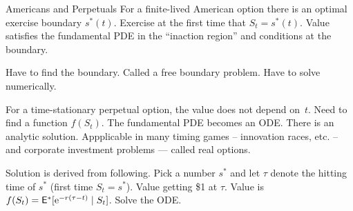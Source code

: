 \documentclass[xcolor=dvipsnames,10pt]{beamer}
\begin{document}
\begin{frame}{Americans and Perpetuals}
For a finite-lived American option there is an optimal exercise boundary $s^*(t)$.  Exercise at the first time that $S_t=s^*(t)$.  Value satisfies the fundamental PDE in the ``inaction region'' and conditions at the boundary.

Have to find the boundary.  Called a free boundary problem.  Have to solve numerically.

For a time-stationary perpetual option, the value does not depend on~$t$.  Need to find a function $f(S_t)$.  The fundamental PDE becomes an ODE.  There is an analytic solution.  Appplicable in many timing games -- innovation races, etc. -- and corporate investment problems --- called real options.

Solution is derived from following.  Pick a number $s^*$ and let $\tau$ denote the hitting time of $s^*$ (first time $S_t=s^*$).  Value getting \$1 at $\tau$.  Value is $f(S_t) = \mathsf{E}^*[\mathrm{e}^{-r(\tau-t)}\mid S_t]$.  Solve the ODE.
\end{frame}
 

 
\end{document}

